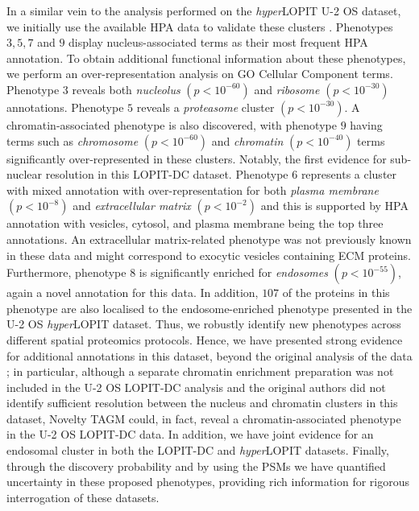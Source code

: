 \documentclass[12pt,english]{article}
\begin{document}
 In a similar vein to the analysis performed on the \textit{hyper}LOPIT U-2 OS dataset, we initially use the available HPA data to validate these clusters \citep{Thul:2017}. Phenotypes $3,5,7$ and $9$ display nucleus-associated terms as their most frequent HPA annotation. To obtain additional functional information about these phenotypes, we perform an over-representation analysis on GO Cellular Component terms. Phenotype $3$ reveals both \textit{nucleolus} $(p < 10^{-60})$ and \textit{ribosome} $(p < 10^{-30})$ annotations. Phenotype $5$ reveals a \textit{proteasome} cluster $(p < 10^{-30})$. A chromatin-associated phenotype is also discovered, with phenotype $9$ having terms such as \textit{chromosome} $(p < 10^{-60})$ and \textit{chromatin} $(p < 10^{-40})$ terms significantly over-represented in these clusters. Notably, the first evidence for sub-nuclear resolution in this LOPIT-DC dataset. Phenotype $6$ represents a cluster with mixed annotation with over-representation for both \textit{plasma membrane} $(p < 10^{-8})$ and \textit{extracellular matrix} $(p < 10^{-2})$ and this is supported by HPA annotation with vesicles, cytosol, and plasma membrane being the top three annotations. An extracellular matrix-related phenotype was not previously known in these data and might correspond to exocytic vesicles containing ECM proteins. Furthermore, phenotype $8$ is significantly enriched for \textit{endosomes} $(p < 10^{-55})$, again a novel annotation for this data. In addition, $107$ of the proteins in this phenotype are also localised to the endosome-enriched phenotype presented in the U-2 OS \textit{hyper}LOPIT dataset. Thus, we robustly identify new phenotypes across different spatial proteomics protocols. Hence, we have presented strong evidence for additional annotations in this dataset, beyond the original analysis of the data \citep{DC:2018}; in particular, although a separate chromatin enrichment preparation was not included in the U-2 OS LOPIT-DC analysis and the original authors did not identify sufficient resolution between the nucleus and chromatin clusters in this dataset, Novelty TAGM could, in fact, reveal a chromatin-associated phenotype in the U-2 OS LOPIT-DC data. In addition, we have joint evidence for an endosomal cluster in both the LOPIT-DC and \textit{hyper}LOPIT datasets. Finally, through the discovery probability and by using the PSMs we have quantified uncertainty in these proposed phenotypes, providing rich information for rigorous interrogation of these datasets.
 
\end{document}
